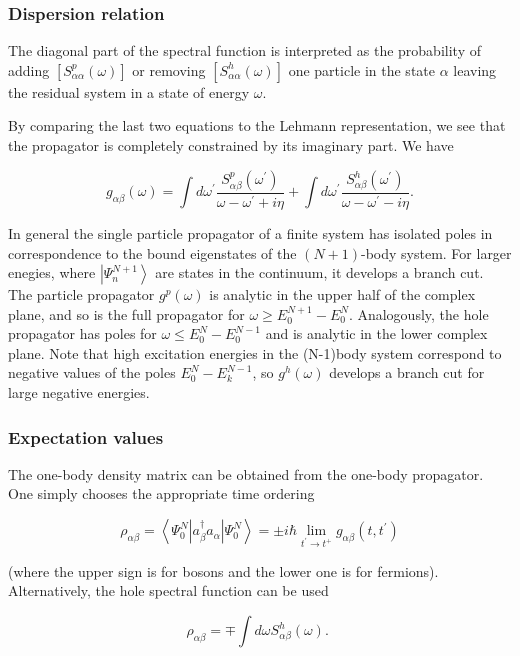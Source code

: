 \documentclass[compress]{beamer}
\begin{document}
\frame
{
\frametitle{Dispersion relation}
\begin{small}
{\scriptsize
The diagonal part of the spectral function is interpreted as the
probability of adding $\left[S_{\alpha \alpha}^{p}(\omega)\right]$ or
removing $\left[S_{\alpha \alpha}^{h}(\omega)\right]$ one particle in
the state $\alpha$ leaving the residual system in a state of energy
$\omega$.

By comparing the last two equations to the Lehmann representation, we
see that the propagator is completely constrained by its imaginary
part. We have

$$
g_{\alpha \beta}(\omega)=\int d \omega^{\prime} \frac{S_{\alpha \beta}^{p}\left(\omega^{\prime}\right)}{\omega-\omega^{\prime}+i \eta}+\int d \omega^{\prime} \frac{S_{\alpha \beta}^{h}\left(\omega^{\prime}\right)}{\omega-\omega^{\prime}-i \eta} .
$$

In general the single particle propagator of a finite system has
isolated poles in correspondence to the bound eigenstates of the
$(N+1)$-body system. For larger enegies, where
$\left|\Psi_{n}^{N+1}\right\rangle$ are states in the continuum, it
develops a branch cut. The particle propagator $g^{p}(\omega)$ is
analytic in the upper half of the complex plane, and so is the full
propagator for $\omega \geq
E_{0}^{N+1}-E_{0}^{N}$. Analogously, the hole propagator has poles for
$\omega \leq E_{0}^{N}-E_{0}^{N-1}$ and is analytic in the lower
complex plane. Note that high excitation energies in the (N-1)body
system correspond to negative values of the poles
$E_{0}^{N}-E_{k}^{N-1}$, so $g^{h}(\omega)$ develops a branch cut for
large negative energies.

}
\end{small}
}
\frame
{
\frametitle{Expectation values}
\begin{small}
{\scriptsize
The one-body density matrix can be obtained from the one-body
propagator. One simply chooses the appropriate time ordering

$$
\rho_{\alpha \beta}=\left\langle\Psi_{0}^{N}\left|a_{\beta}^{\dagger} a_{\alpha}\right| \Psi_{0}^{N}\right\rangle= \pm i \hbar \lim _{t^{\prime} \rightarrow t^{+}} g_{\alpha \beta}\left(t, t^{\prime}\right)
$$

(where the upper sign is for bosons and the lower one is for fermions). Alternatively, the hole spectral function can be used

$$
\rho_{\alpha \beta}=\mp \int d \omega S_{\alpha \beta}^{h}(\omega) \text {. }
$$

}
\end{small}
}
\end{document}
